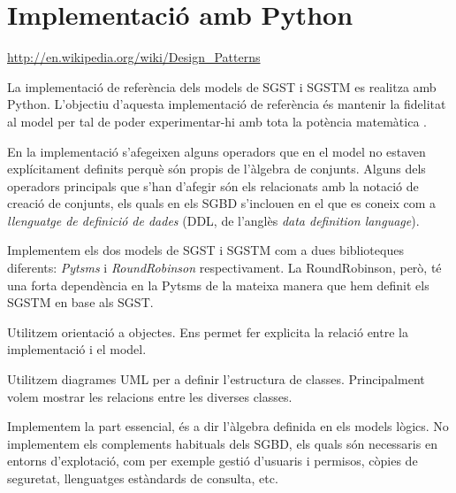 

\chapter{Implementació amb Python}


\url{http://en.wikipedia.org/wiki/Design_Patterns}


La implementació de referència dels models de SGST i SGSTM es realitza
amb Python. L'objectiu d'aquesta implementació de
referència és mantenir la fidelitat al model per tal de poder
experimentar-hi amb tota la potència matemàtica .

En la implementació s'afegeixen alguns operadors que en el model no
estaven explícitament definits perquè són propis de l'àlgebra de
conjunts. Alguns dels operadors principals que s'han d'afegir són els
relacionats amb la notació de creació de
conjunts, %
els quals en els SGBD s'inclouen en el que es coneix com a
\emph{llenguatge de definició de dades} (DDL, de l'anglès \emph{data
  definition language}).





Implementem els dos models de SGST i SGSTM com a dues biblioteques
diferents: \emph{Pytsms} i \emph{RoundRobinson} respectivament. La
RoundRobinson, però, té una forta dependència en la
Pytsms de la mateixa manera que hem definit els SGSTM en base
als SGST.


Utilitzem orientació a objectes. Ens permet fer explicita la relació
entre la implementació i el model. 

Utilitzem diagrames UML per a definir l'estructura de classes. Principalment volem mostrar les relacions entre les diverses classes.


Implementem la part essencial, és a dir l'àlgebra definida en els
models lògics. No implementem els complements habituals dels SGBD, els
quals són necessaris en entorns d'explotació, com per exemple gestió
d'usuaris i permisos, còpies de seguretat, llenguatges estàndards de
consulta, etc.




